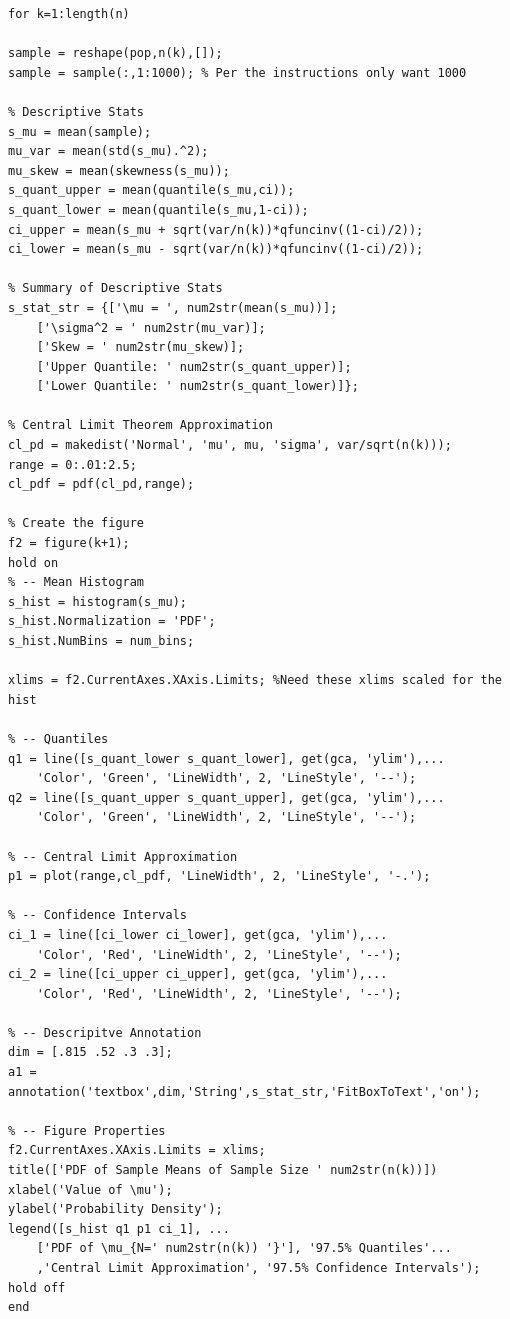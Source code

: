 \documentclass[12pt]{article}
\begin{document}
\begin{verbatim}
for k=1:length(n)

sample = reshape(pop,n(k),[]);
sample = sample(:,1:1000); % Per the instructions only want 1000

% Descriptive Stats
s_mu = mean(sample);
mu_var = mean(std(s_mu).^2);
mu_skew = mean(skewness(s_mu));
s_quant_upper = mean(quantile(s_mu,ci));
s_quant_lower = mean(quantile(s_mu,1-ci));
ci_upper = mean(s_mu + sqrt(var/n(k))*qfuncinv((1-ci)/2));
ci_lower = mean(s_mu - sqrt(var/n(k))*qfuncinv((1-ci)/2));

% Summary of Descriptive Stats
s_stat_str = {['\mu = ', num2str(mean(s_mu))];
    ['\sigma^2 = ' num2str(mu_var)];
    ['Skew = ' num2str(mu_skew)];
    ['Upper Quantile: ' num2str(s_quant_upper)];
    ['Lower Quantile: ' num2str(s_quant_lower)]};

% Central Limit Theorem Approximation
cl_pd = makedist('Normal', 'mu', mu, 'sigma', var/sqrt(n(k)));
range = 0:.01:2.5;
cl_pdf = pdf(cl_pd,range);

% Create the figure
f2 = figure(k+1);
hold on
% -- Mean Histogram
s_hist = histogram(s_mu);
s_hist.Normalization = 'PDF';
s_hist.NumBins = num_bins;

xlims = f2.CurrentAxes.XAxis.Limits; %Need these xlims scaled for the hist

% -- Quantiles
q1 = line([s_quant_lower s_quant_lower], get(gca, 'ylim'),...
    'Color', 'Green', 'LineWidth', 2, 'LineStyle', '--');
q2 = line([s_quant_upper s_quant_upper], get(gca, 'ylim'),...
    'Color', 'Green', 'LineWidth', 2, 'LineStyle', '--');

% -- Central Limit Approximation
p1 = plot(range,cl_pdf, 'LineWidth', 2, 'LineStyle', '-.');

% -- Confidence Intervals
ci_1 = line([ci_lower ci_lower], get(gca, 'ylim'),...
    'Color', 'Red', 'LineWidth', 2, 'LineStyle', '--');
ci_2 = line([ci_upper ci_upper], get(gca, 'ylim'),...
    'Color', 'Red', 'LineWidth', 2, 'LineStyle', '--');

% -- Descripitve Annotation
dim = [.815 .52 .3 .3];
a1 = annotation('textbox',dim,'String',s_stat_str,'FitBoxToText','on');

% -- Figure Properties
f2.CurrentAxes.XAxis.Limits = xlims;
title(['PDF of Sample Means of Sample Size ' num2str(n(k))])
xlabel('Value of \mu');
ylabel('Probability Density');
legend([s_hist q1 p1 ci_1], ...
    ['PDF of \mu_{N=' num2str(n(k)) '}'], '97.5% Quantiles'...
    ,'Central Limit Approximation', '97.5% Confidence Intervals');
hold off
end
\end{verbatim}
\end{document}
